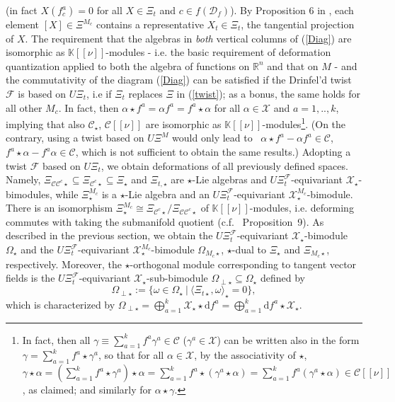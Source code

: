\documentclass[a4paper,11pt]{article}
\newcommand{\RR}{\mathbb{R}}
\begin{document}
(in fact $X(f^a_c)=0$ for all $X\in\Xi_t$ and $c\in f(\mathcal{D}_f)$). By Proposition 6 in
\cite{FioreWeber}, each element $[X]\in\Xi^{M_c}$ contains a representative $X_t\in\Xi_t$, the tangential projection of $X$.
The requirement that the   algebras in {\it both} vertical columns of (\ref{Diag}) 
are isomorphic as $\mathbb{K}[[\nu]]$-modules - i.e. the basic requirement of deformation quantization applied to both the
algebra of functions on $\RR^n$ and that on $M$ - and the commutativity of the diagram (\ref{Diag}) can be satisfied if the Drinfel'd twist $\mathcal{F}$ is based on $U\Xi_t$, i.e if $\Xi_t$ replaces $\Xi$ in (\ref{twist}); as a bonus, the same holds for all other $M_c$.
In fact, then $\alpha\star f^a=\alpha f^a=f^a\star \alpha$
for all $\alpha\in\mathcal{X}$ and $a=1,..,k$, implying that  also
 $\mathcal{C}_\star$, $\mathcal{C}[[\nu]]$ are isomorphic as $\mathbb{K}[[\nu]]$-modules\footnote{In fact, then
all $\gamma\equiv \sum_{a=1}^kf^a \gamma^a\in \mathcal{C}$ ($\gamma^a\in\mathcal{X}$) can be written also in the form
$\gamma=\sum_{a=1}^kf^a \star \gamma^a$, so that for all $\alpha\in\mathcal{X}$, by the associativity of $\star$, 
$ \gamma\star \alpha=(\sum_{a=1}^kf^a \star \gamma^a)\star \alpha=\sum_{a=1}^kf^a \star (\gamma^a\star \alpha)
=\sum_{a=1}^kf^a (\gamma^a\star \alpha)\in \mathcal{C}[[\nu]]$, as claimed; and similarly for $\alpha\star \gamma$.}.
(On the contrary, using a twist based on $U\Xi^{M}$ would only lead to  \ $\alpha\star f^a\!-\!\alpha f^a\in \mathcal{C}$, $f^a\star \alpha\!-\!f^a\alpha\in \mathcal{C}$, which is  not sufficient  to obtain the same results.)
Adopting  a  twist
$\mathcal{F}$ based on $U\Xi_t$, we obtain deformations of all previously defined spaces.
Namely, $\Xi_{\mathcal{C}\mathcal{C}^c\star}\subseteq\Xi_{\mathcal{C}^c\star}
\subseteq\Xi_\star$ and $\Xi_{t,\star}
$ are $\star$-Lie algebras and $U\Xi_t^\mathcal{F}$-equivariant
$\mathcal{X}_\star$-bimodules, while $\Xi^{M_c}_\star$ is a $\star$-Lie algebra and an 
$U\Xi_t^\mathcal{F}$-equivariant $\mathcal{X}^{M_c}_\star$-bimodule. 
There is an isomorphism $\Xi^{M_c}_\star
\cong\Xi_{\mathcal{C}^c\star}/\Xi_{\mathcal{C}\mathcal{C}^c\star}$ of
$\mathbb{K}[[\nu]]$-modules, i.e. deforming commutes with taking the submanifold quotient
(c.f. \cite{FioreWeber}~Proposition~9). 
As described in the previous section, we obtain the
$U\Xi_t^\mathcal{F}$-equivariant $\mathcal{X}_\star$-bimodule $\Omega_\star$
and the
$U\Xi_t^\mathcal{F}$-equivariant $\mathcal{X}^{M_c}_\star$-bimodule
$\Omega_{M_c\star}$, $\star$-dual to $\Xi_\star$ and $\Xi_{M_c\star}$, respectively.
Moreover, the $\star$-orthogonal module corresponding to tangent vector fields is
the $U\Xi_t^\mathcal{F}$-equivariant $\mathcal{X}_\star$-sub-bimodule
$\Omega_{\perp\star}\subseteq\Omega_\star$ defined by
\begin{equation}\label{eq06}
    \Omega_{\perp\star}:=\{\omega\in\Omega_\star~|~
    \langle\Xi_{t\star},\omega\rangle_\star=0\},
\end{equation}
which is characterized by $\Omega_{\perp\star}=\bigoplus_{a=1}^k\mathcal{X}_\star\star\mathrm{d}f^a
=\bigoplus_{a=1}^k\mathrm{d}f^a\star\mathcal{X}_\star$.
\end{document}
